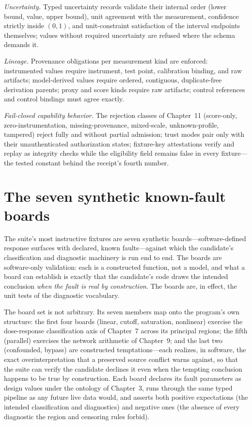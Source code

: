 \emph{Uncertainty.} Typed uncertainty records validate their internal order (lower bound, value, upper bound), unit agreement with the measurement, confidence strictly inside $(0,1)$, and unit-constraint satisfaction of the interval endpoints themselves; values without required uncertainty are refused where the schema demands it.

\emph{Lineage.} Provenance obligations per measurement kind are enforced: instrumented values require instrument, test point, calibration binding, and raw artifacts; model-derived values require ordered, contiguous, duplicate-free derivation parents; proxy and score kinds require raw artifacts; control references and control bindings must agree exactly.

\emph{Fail-closed capability behavior.} The rejection classes of Chapter~11 (score-only, zero-instrumentation, missing-provenance, mixed-scale, unknown-profile, tampered) reject fully and without partial admission; trust modes pair only with their unauthenticated authorization states; fixture-key attestations verify and replay as integrity checks while the eligibility field remains false in every fixture---the tested constant behind the receipt's fourth number.

\section{The seven synthetic known-fault boards}\label{evid:sec:boards}

The suite's most instructive fixtures are seven synthetic boards---software-defined response surfaces with declared, known faults---against which the candidate's classification and diagnostic machinery is run end to end. The boards are software-only validation: each is a constructed function, not a model, and what a board can establish is exactly that the candidate's code draws the intended conclusion \emph{when the fault is real by construction}. The boards are, in effect, the unit tests of the diagnostic vocabulary.

The board set is not arbitrary. Its seven members map onto the program's own structure: the first four boards (linear, cutoff, saturation, nonlinear) exercise the dose-response classification axis of Chapter~7 across its principal regions; the fifth (parallel) exercises the network arithmetic of Chapter~9; and the last two (confounded, bypass) are constructed temptations---each realizes, in software, the exact overinterpretation that a preserved source conflict warns against, so that the suite can verify the candidate declines it even when the tempting conclusion happens to be true by construction. Each board declares its fault parameters as design values under the ontology of Chapter~3, runs through the same typed pipeline as any future live data would, and asserts both positive expectations (the intended classification and diagnostics) and negative ones (the absence of every diagnostic the region and censoring rules forbid).

